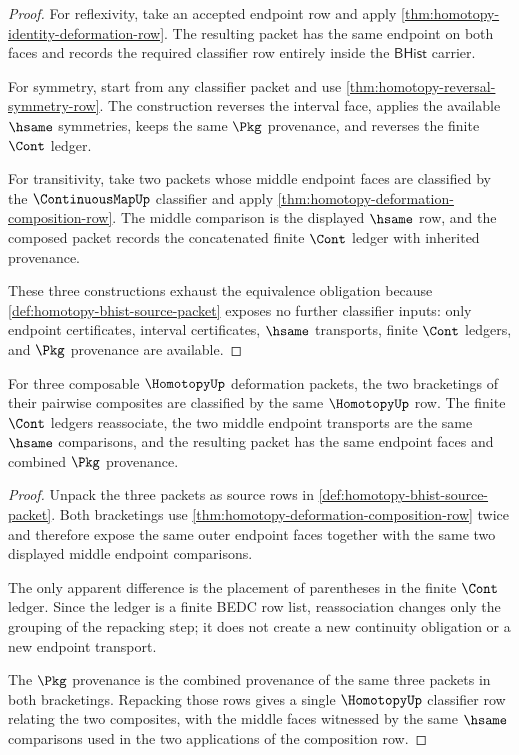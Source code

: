 \begin{proof}
For reflexivity, take an accepted endpoint row and apply
\autoref{thm:homotopy-identity-deformation-row}. The resulting packet has the
same endpoint on both faces and records the required classifier row entirely
inside the $\mathsf{BHist}$ carrier.

For symmetry, start from any classifier packet and use
\autoref{thm:homotopy-reversal-symmetry-row}. The construction reverses the
interval face, applies the available $\hsame$ symmetries, keeps the same
$\Pkg$ provenance, and reverses the finite $\Cont$ ledger.

For transitivity, take two packets whose middle endpoint faces are classified
by the $\ContinuousMapUp$ classifier and apply
\autoref{thm:homotopy-deformation-composition-row}. The middle comparison is
the displayed $\hsame$ row, and the composed packet records the concatenated
finite $\Cont$ ledger with inherited provenance.

These three constructions exhaust the equivalence obligation because
\autoref{def:homotopy-bhist-source-packet} exposes no further classifier
inputs: only endpoint certificates, interval certificates, $\hsame$
transports, finite $\Cont$ ledgers, and $\Pkg$ provenance are available.
\end{proof}

\begin{theorem}
\label{thm:homotopy-composition-associativity-row}
For three composable $\HomotopyUp$ deformation packets, the two bracketings of
their pairwise composites are classified by the same $\HomotopyUp$ row. The
finite $\Cont$ ledgers reassociate, the two middle endpoint transports are the
same $\hsame$ comparisons, and the resulting packet has the same endpoint
faces and combined $\Pkg$ provenance.
\end{theorem}

\begin{proof}
Unpack the three packets as source rows in
\autoref{def:homotopy-bhist-source-packet}. Both bracketings use
\autoref{thm:homotopy-deformation-composition-row} twice and therefore expose
the same outer endpoint faces together with the same two displayed middle
endpoint comparisons.

The only apparent difference is the placement of parentheses in the finite
$\Cont$ ledger. Since the ledger is a finite BEDC row list, reassociation
changes only the grouping of the repacking step; it does not create a new
continuity obligation or a new endpoint transport.

The $\Pkg$ provenance is the combined provenance of the same three packets in
both bracketings. Repacking those rows gives a single $\HomotopyUp$
classifier row relating the two composites, with the middle faces witnessed by
the same $\hsame$ comparisons used in the two applications of the composition
row.
\end{proof}

